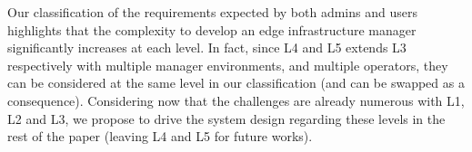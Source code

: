 Our classification of the requirements expected by both admins and users
highlights that the complexity to develop an edge infrastructure manager
significantly increases at each level. In fact, since L4 and L5 extends L3
respectively with multiple manager environments, and multiple operators, they
can be considered at the same level in our classification (and can be swapped
as a consequence).
Considering now that the challenges are already numerous with L1, L2 and L3, we
propose to drive the system design regarding these levels in the rest of the
paper (leaving L4 and L5 for future works).

